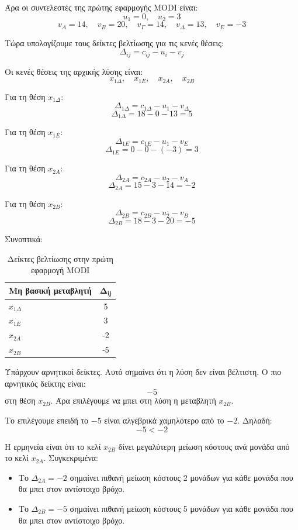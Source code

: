 \documentclass[12pt,a4paper]{article}
\begin{document}
Άρα οι συντελεστές της πρώτης εφαρμογής MODI είναι:
\[
u_1=0,\quad u_2=3
\]
\[
v_A=14,\quad v_B=20,\quad v_\Gamma=14,\quad v_\Delta=13,\quad v_E=-3
\]

Τώρα υπολογίζουμε τους δείκτες βελτίωσης για τις κενές θέσεις:
\[
\Delta_{ij}=c_{ij}-u_i-v_j
\]

Οι κενές θέσεις της αρχικής λύσης είναι:
\[
x_{1\Delta},\quad x_{1E},\quad x_{2A},\quad x_{2B}
\]

Για τη θέση \(x_{1\Delta}\):
\[
\Delta_{1\Delta}=c_{1\Delta}-u_1-v_\Delta
\]
\[
\Delta_{1\Delta}=18-0-13=5
\]

Για τη θέση \(x_{1E}\):
\[
\Delta_{1E}=c_{1E}-u_1-v_E
\]
\[
\Delta_{1E}=0-0-(-3)=3
\]

Για τη θέση \(x_{2A}\):
\[
\Delta_{2A}=c_{2A}-u_2-v_A
\]
\[
\Delta_{2A}=15-3-14=-2
\]

Για τη θέση \(x_{2B}\):
\[
\Delta_{2B}=c_{2B}-u_2-v_B
\]
\[
\Delta_{2B}=18-3-20=-5
\]

Συνοπτικά:

\begin{table}[H]
\centering
\caption{Δείκτες βελτίωσης στην πρώτη εφαρμογή MODI}
\begin{tabular}{lc}
\toprule
\textbf{Μη βασική μεταβλητή} & \(\boldsymbol{\Delta_{ij}}\) \\
\midrule
\(x_{1\Delta}\) & 5 \\
\(x_{1E}\) & 3 \\
\(x_{2A}\) & -2 \\
\(x_{2B}\) & -5 \\
\bottomrule
\end{tabular}
\end{table}

Υπάρχουν αρνητικοί δείκτες. Αυτό σημαίνει ότι η λύση δεν είναι βέλτιστη. Ο πιο αρνητικός δείκτης είναι:
\[
-5
\]
στη θέση \(x_{2B}\). Άρα επιλέγουμε να μπει στη λύση η μεταβλητή \(x_{2B}\).

Το επιλέγουμε επειδή το \(-5\) είναι αλγεβρικά χαμηλότερο από το \(-2\). Δηλαδή:
\[
-5<-2
\]

Η ερμηνεία είναι ότι το κελί \(x_{2B}\) δίνει μεγαλύτερη μείωση κόστους ανά μονάδα από το κελί \(x_{2A}\). Συγκεκριμένα:

\begin{itemize}
    \item Το \(\Delta_{2A}=-2\) σημαίνει πιθανή μείωση κόστους 2 μονάδων για κάθε μονάδα που θα μπει στον αντίστοιχο βρόχο.
    \item Το \(\Delta_{2B}=-5\) σημαίνει πιθανή μείωση κόστους 5 μονάδων για κάθε μονάδα που θα μπει στον αντίστοιχο βρόχο.
\end{itemize}
\end{document}
